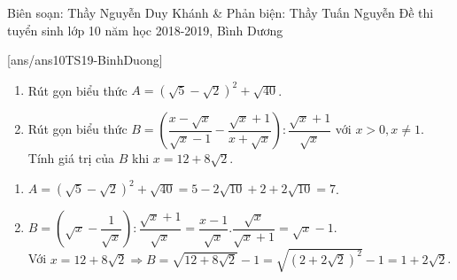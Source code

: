 
\begin{name}
{Biên soạn: Thầy Nguyễn Duy Khánh \& Phản biện: Thầy Tuấn Nguyễn}
{Đề thi tuyển sinh lớp 10 năm học 2018-2019, Bình Dương}
\end{name}
\setcounter{bt}{0}
[ans/ans10TS19-BinhDuong]




\begin{bt}%
\hfill

	\begin{enumerate}
		\item Rút gọn biểu thức $A = \left(\sqrt{5}-\sqrt{2}\right)^2+\sqrt{40}$.
		\item Rút gọn biểu thức $B = \left(\dfrac{x-\sqrt{x}}{\sqrt{x}-1}-\dfrac{\sqrt{x}+1}{x+\sqrt{x}}\right):\dfrac{\sqrt{x}+1}{\sqrt{x}}$ với $x > 0, x\ne 1$.\\
		Tính giá trị của $B$ khi $x = 12+8\sqrt{2}$.
	\end{enumerate}	
	\loigiai
	{
		\begin{enumerate}
			\item $A = \left(\sqrt{5}-\sqrt{2}\right)^2+\sqrt{40} = 5-2\sqrt{10}+2+2\sqrt{10} = 7$.
			\item $B = \left(\sqrt{x}-\dfrac{1}{\sqrt{x}}\right):\dfrac{\sqrt{x}+1}{\sqrt{x}} = \dfrac{x-1}{\sqrt{x}}.\dfrac{\sqrt{x}}{\sqrt{x}+1}=\sqrt{x}-1$.\\
			Với $x=12+8\sqrt{2}\Rightarrow B = \sqrt{12+8\sqrt{2}}-1=\sqrt{\left(2+2\sqrt{2}\right)^2}-1 = 1+2\sqrt{2}$.
		\end{enumerate}	
	}
\end{bt}

